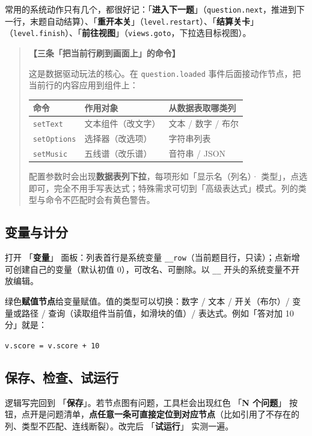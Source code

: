 \documentclass[UTF8,a4paper,zihao=-4]{ctexart}
\newcommand{\code}[1]{\texttt{#1}}   %
\newcommand{\ui}[1]{「\textbf{#1}」}  %
\newenvironment{tip}[1][提示]{%
  \begin{quote}\small\textbf{【#1】}\ignorespaces
}{\end{quote}}
\begin{document}
常用的系统动作只有几个，都很好记：\ui{进入下一题}（\code{question.next}，推进到下一行，末题自动结算）、\ui{重开本关}（\code{level.restart}）、\ui{结算关卡}（\code{level.finish}）、\ui{前往视图}（\code{views.goto}，下拉选目标视图）。

\begin{tip}[三条「把当前行刷到画面上」的命令]
这是数据驱动玩法的核心。在 \code{question.loaded} 事件后面接动作节点，把当前行的内容应用到组件上：

\begin{center}
\begin{tabular}{lll}
\toprule
命令 & 作用对象 & 从数据表取哪类列 \\
\midrule
\code{setText} & 文本组件（改文字） & 文本 / 数字 / 布尔 \\
\code{setOptions} & 选择器（改选项） & 字符串列表 \\
\code{setMusic} & 五线谱（改乐谱） & 音符串 / JSON \\
\bottomrule
\end{tabular}
\end{center}

配置参数时会出现\textbf{数据表列下拉}，每项形如「显示名（列名）· 类型」，点选即可，完全不用手写表达式；特殊需求可切到「高级表达式」模式。列的类型与命令不匹配时会有黄色警告。
\end{tip}

\subsection{变量与计分}

打开 \ui{变量} 面板：列表首行是系统变量 \code{\_\_row}（当前题目行，只读）；点新增可创建自己的变量（默认初值 0），可改名、可删除。以 \code{\_\_} 开头的系统变量不开放编辑。

绿色\textbf{赋值节点}给变量赋值。值的类型可以切换：数字 / 文本 / 开关（布尔）/ 变量或路径 / 查询（读取组件当前值，如滑块的值）/ 表达式。例如「答对加 10 分」就是：

\begin{center}
\code{v.score = v.score + 10}
\end{center}

\subsection{保存、检查、试运行}

逻辑写完回到 \ui{保存}。若节点图有问题，工具栏会出现红色 \ui{N 个问题} 按钮，点开是问题清单，\textbf{点任意一条可直接定位到对应节点}（比如引用了不存在的列、类型不匹配、连线断裂）。改完后 \ui{试运行} 实测一遍。
\end{document}
